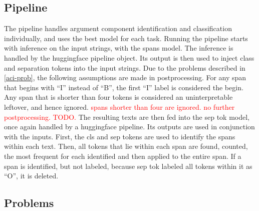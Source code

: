 \documentclass[12]{article}
\theoremstyle{mytheoremstyle}
\theoremstyle{mytheoremstyle}
\theoremstyle{myproblemstyle}
\begin{document}
  \subsection{Pipeline} \label{pipeline}
  The pipeline handles argument component identification and classification individually, and uses the best model for each task. 
  Running the pipeline starts with inference on the input strings, with the spans model. 
  The inference is handled by the huggingface pipeline object. 
  Its output is then used to inject class and separation tokens into the input strings. 
  Due to the problems described in \ref{aci-prob}, the following assumptions are made in postprocessing. 
  For any span that begins with ``I'' instead of ``B'', the first ``I'' label is considered the begin. 
  Any span that is shorter than four tokens is considered an uninterpretable leftover, and hence ignored.  
  \textcolor{red}{spans shorter than four are ignored. no further postprocessing. TODO.} 
  The resulting texts are then fed into the sep tok model, once again handled by a huggingface pipeline. 
  Its outputs are used in conjunction with the inputs. 
  First, the cls and sep tokens are used to identify the spans within each text. 
  Then, all tokens that lie within each span are found, counted, the most frequent for each identified and then applied to the entire span. 
  If a span is identified, but not labeled, because sep tok labeled all tokens within it as ``O'', it is deleted.
  \subsection{Problems} \label{problems}
\end{document}
